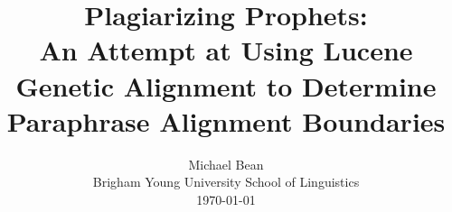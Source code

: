 \title{Plagiarizing Prophets:\\
An Attempt at Using Lucene Genetic Alignment to Determine Paraphrase Alignment Boundaries}

\author{Michael Bean\\
Brigham Young University School of Linguistics\\
\today}
\maketitle
